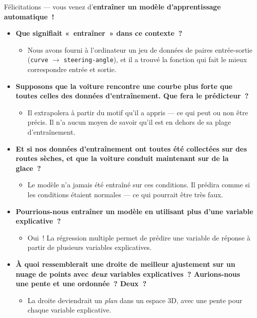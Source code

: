 \documentclass[12pt,a4paper]{article}
\begin{document}
\begin{keypointbox}
  Félicitations — vous venez d'\textbf{entraîner un modèle d'apprentissage automatique~!}

  \begin{itemize}
    \item \textbf{Que signifiait «~entraîner~» dans ce contexte~?}
    \begin{itemize}
      \item Nous avons fourni à l'ordinateur un jeu de données de paires entrée-sortie (\texttt{curve} $\to$ \texttt{steering-angle}), et il a trouvé la fonction qui fait le mieux correspondre entrée et sortie.
    \end{itemize}
    \item \textbf{Supposons que la voiture rencontre une courbe plus forte que toutes celles des données d'entraînement. Que fera le prédicteur~?}
    \begin{itemize}
      \item Il extrapolera à partir du motif qu'il a appris — ce qui peut ou non être précis. Il n'a aucun moyen de savoir qu'il est en dehors de sa plage d'entraînement.
    \end{itemize}
    \item \textbf{Et si nos données d'entraînement ont toutes été collectées sur des routes sèches, et que la voiture conduit maintenant sur de la glace~?}
    \begin{itemize}
      \item Le modèle n'a jamais été entraîné sur ces conditions. Il prédira comme si les conditions étaient normales — ce qui pourrait être très faux.
    \end{itemize}
  \end{itemize}
\end{keypointbox}

\begin{thinkbox}
  \begin{itemize}
    \item \textbf{Pourrions-nous entraîner un modèle en utilisant plus d'une variable explicative~?}
    \begin{itemize}
      \item Oui~! La régression multiple permet de prédire une variable de réponse à partir de plusieurs variables explicatives.
    \end{itemize}
    \item \textbf{À quoi ressemblerait une droite de meilleur ajustement sur un nuage de points avec \emph{deux} variables explicatives~? Aurions-nous une pente et une ordonnée~? Deux~?}
    \begin{itemize}
      \item La droite deviendrait un \emph{plan} dans un espace 3D, avec une pente pour chaque variable explicative.
    \end{itemize}
  \end{itemize}
\end{thinkbox}
\end{document}
